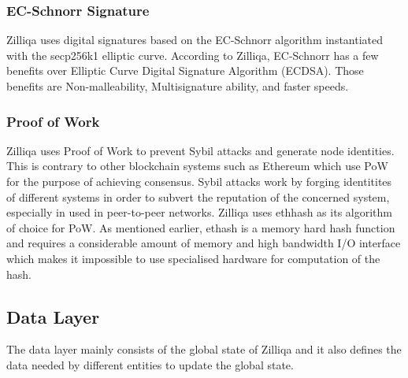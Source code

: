 \documentclass[a4paper,twoside,phd]{BYUPhys}
\begin{document}
\subsubsection{EC-Schnorr Signature}
Zilliqa uses digital signatures based on the EC-Schnorr algorithm instantiated with the secp256k1 elliptic curve. According to Zilliqa, EC-Schnorr has a few benefits over Elliptic Curve Digital Signature Algorithm (ECDSA). Those benefits are Non-malleability, Multisignature ability, and faster speeds. 

\subsubsection{Proof of Work}
Zilliqa uses Proof of Work to prevent Sybil attacks and generate node identities. This is contrary to other blockchain systems such as Ethereum which use PoW for the purpose of achieving consensus. Sybil attacks work by forging identitites of different systems in order to subvert the reputation of the concerned system, especially in used in peer-to-peer networks. Zilliqa uses ethhash as its algorithm of choice for PoW. As mentioned earlier, ethash is a memory hard hash function and requires a considerable amount of memory and high bandwidth I/O interface which makes it impossible to use specialised hardware for computation of the hash.
\subsection{Data Layer}
The data layer mainly consists of the global state of Zilliqa and it also defines the data needed by different entities to update the global state. 
\end{document}
